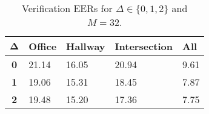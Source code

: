 \begin{table}[h]
    \centering
    \begin{tabular}{|c|M{2cm}|M{2cm}|M{2cm}|M{2cm}|}
    \hline
    $\boldsymbol{\Delta}$ & \bf{Office} & \bf{Hallway} & \bf{Intersection} & \bf{All} \\ 
    \hline 
    \hline
    \bf{0} & 21.14 & 16.05 & 20.94 & 9.61 \\
    \hline
    \bf{1} & 19.06 & 15.31 & 18.45 & 7.87 \\
    \hline
    \bf{2} & 19.48 & 15.20 & 17.36 & 7.75 \\
    \hline
    \end{tabular}
    \caption{Verification EERs for $\Delta \in \{0, 1, 2\}$ and $M = 32$.}
    \label{tab:verify_speakers_M_32}
\end{table}
